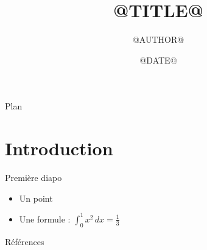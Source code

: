 \documentclass[aspectratio=169]{beamer}
\title{@TITLE@}
\author{@AUTHOR@}
\date{@DATE@}
\begin{document}
\maketitle

\begin{frame}{Plan}
  \tableofcontents
\end{frame}

\section{Introduction}
\begin{frame}{Première diapo}
  \begin{itemize}
    \item Un point
    \item Une formule : $\int_0^1 x^2 \, dx = \frac{1}{3}$
  \end{itemize}
\end{frame}

\begin{frame}{Références}
  \printbibliography
\end{frame}
\end{document}
